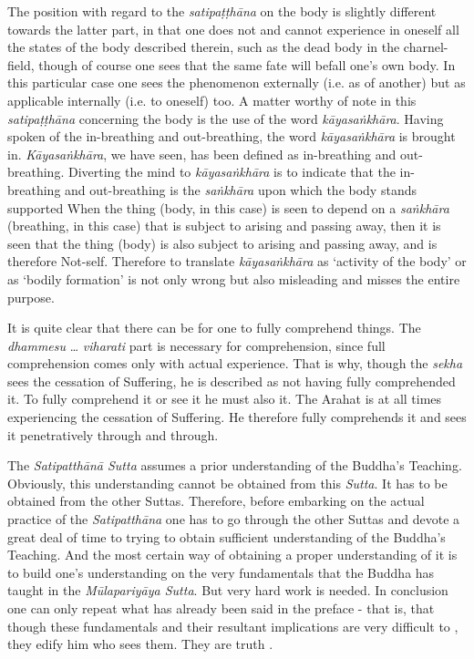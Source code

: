 The position with regard to the \emph{satipaṭṭhāna} on the body is slightly different towards the latter part, in that one does not and cannot experience in oneself all the states of the body described therein, such as the dead body in the charnel-field, though of course one sees that the same fate will befall one's own body. In this particular case one sees the phenomenon externally (i.e. as of another) but as applicable internally (i.e. to oneself) too. A matter worthy of note in this \emph{satipaṭṭhāna} concerning the body is the use of the word \emph{kāyasaṅkhāra}. Having spoken of the in-breathing and out-breathing, the word \emph{kāyasaṅkhāra} is brought in. \emph{Kāyasaṅkhāra}, we have seen, has been defined as in-breathing and out-breathing. Diverting the mind to \emph{kāyasaṅkhāra} is to indicate that the in-breathing and out-breathing is the \emph{saṅkhāra} upon which the body stands supported When the thing (body, in this case) is seen to depend on a \emph{saṅkhāra} (breathing, in this case) that is subject to arising and passing away, then it is seen that the thing (body) is also subject to arising and passing away, and is therefore Not-self. Therefore to translate \emph{kāyasaṅkhāra} as `activity of the body' or as `bodily formation' is not only wrong but also misleading and misses the entire purpose.

It is quite clear that there can be  for one to fully comprehend things. The \emph{dhammesu} \ldots\hspace{0pt} \emph{viharati} part is necessary for  comprehension, since full comprehension comes only with actual experience. That is why, though the \emph{sekha} sees the cessation of Suffering, he is described as not having fully comprehended it. To fully comprehend it or  see it  he must also  it. The Arahat is at all times experiencing the cessation of Suffering. He therefore fully comprehends it and sees it penetratively through and through.

\protect\hypertarget{truth-for-him}{}{}The \emph{Satipatthānā Sutta} assumes a prior understanding of the Buddha's Teaching. Obviously, this understanding cannot be obtained from this \emph{Sutta}. It has to be obtained from the other Suttas. Therefore, before embarking on the actual practice of the \emph{Satipatthāna} one has to go through the other Suttas and devote a great deal of time to trying to obtain sufficient understanding of the Buddha's Teaching. And the most certain way of obtaining a proper understanding of it is to build one's understanding on the very fundamentals that the Buddha has taught in the \emph{Mūlapariyāya Sutta}. But very hard work is needed. In conclusion one can only repeat what has already been said in the preface - that is, that though these fundamentals and their resultant implications are very difficult to , they edify him who sees them. They are truth .
